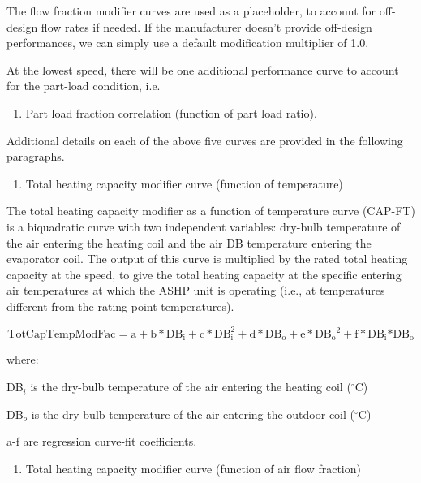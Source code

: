 The flow fraction modifier curves are used as a placeholder, to account for off-design flow rates if needed. If the manufacturer doesn't provide off-design performances, we can simply use a default modification multiplier of 1.0.

At the lowest speed, there will be one additional performance curve to account for the part-load condition, i.e.

\begin{enumerate}
\def\labelenumi{\arabic{enumi})}
\setcounter{enumi}{4}
\item Part load fraction correlation (function of part load ratio).
\end{enumerate}

Additional details on each of the above five curves are provided in the following paragraphs.

\begin{enumerate}
\def\labelenumi{\arabic{enumi})}
\tightlist
\item
  Total heating capacity modifier curve (function of temperature)
\end{enumerate}

The total heating capacity modifier as a function of temperature curve (CAP-FT) is a biquadratic curve with two independent variables: dry-bulb temperature of the air entering the heating coil and the air DB temperature entering the evaporator coil. The output of this curve is multiplied by the rated total heating capacity at the speed, to give the total heating capacity at the specific entering air temperatures at which the ASHP unit is operating (i.e., at temperatures different from the rating point temperatures).

\begin{equation}
{\mathrm{TotCapTempModFac}} = {\mathrm{a}} + {\mathrm{b*D}}{{\mathrm{B}}_{\mathrm{i}}} + {\mathrm{c*DB}}_{\mathrm{i}}^2 + {\mathrm{d*D}}{{\mathrm{B}}_{\mathrm{o}}} + {\mathrm{e*D}}{{\mathrm{B}}_{\mathrm{o}}}^2 + {\mathrm{f*D}}{{\mathrm{B}}_{\mathrm{i}}}{\mathrm{*D}}{{\mathrm{B}}_{\mathrm{o}}}
\end{equation}

where:

DB\(_{i}\) is the dry-bulb temperature of the air entering the heating coil (\(^{\circ}\)C)

DB\(_{o}\) is the dry-bulb temperature of the air entering the outdoor coil (\(^{\circ}\)C)

a-f are regression curve-fit coefficients.

\begin{enumerate}
\def\labelenumi{\arabic{enumi})}
\setcounter{enumi}{1}
\tightlist
\item
  Total heating capacity modifier curve (function of air flow fraction)
\end{enumerate}

